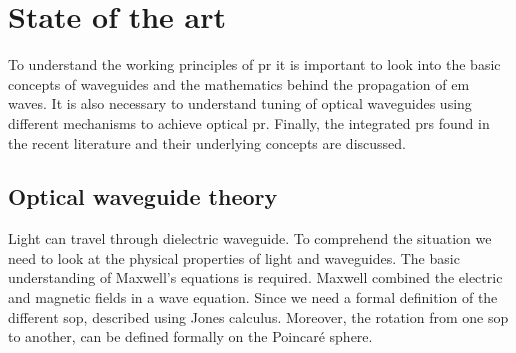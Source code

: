 \documentclass[../report.tex]{subfiles}
\begin{document}
	
	
\chapter{State of the art}
To understand the working principles of \gls{pr} it is important to look into the basic concepts of waveguides and the mathematics behind the propagation of \gls{em} waves. It is also necessary to understand tuning of optical waveguides using different mechanisms to achieve optical \gls{pr}. Finally, the integrated \gls{pr}s found in the recent literature and their underlying concepts are discussed. 

	\section{Optical waveguide theory}
Light can travel through dielectric waveguide. To comprehend the situation we need to look at the physical properties of light and waveguides. The basic understanding of Maxwell's equations is required. Maxwell combined the electric and magnetic fields in a wave equation. Since we need a formal definition of the different \gls{sop}, described using Jones calculus. Moreover, the rotation from one \gls{sop} to another, can be defined formally on the Poincaré sphere. 
		
\end{document}
